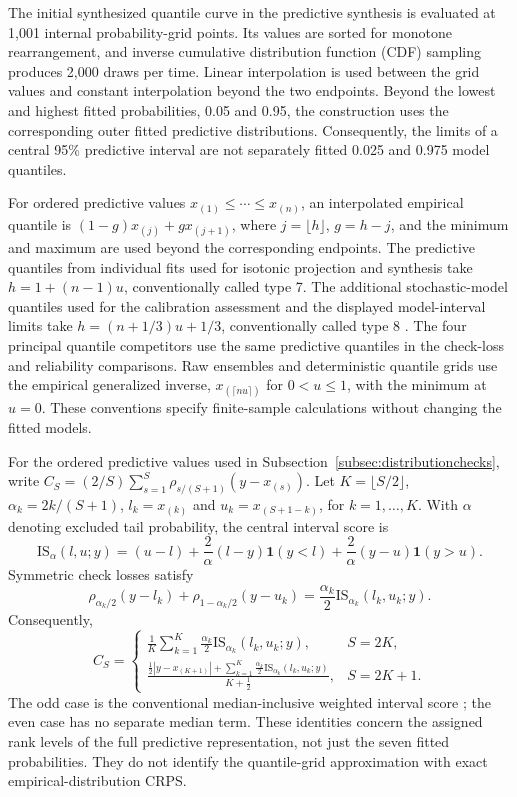 The initial synthesized quantile curve in the predictive synthesis is evaluated at 1,001 internal probability-grid points. Its values are sorted for monotone rearrangement, and inverse cumulative distribution function (CDF) sampling produces 2,000 draws per time. Linear interpolation is used between the grid values and constant interpolation beyond the two endpoints. Beyond the lowest and highest fitted probabilities, 0.05 and 0.95, the construction uses the corresponding outer fitted predictive distributions. Consequently, the limits of a central 95\% predictive interval are not separately fitted 0.025 and 0.975 model quantiles.

For ordered predictive values \(x_{(1)}\leq\cdots\leq x_{(n)}\), an interpolated empirical quantile is \((1-g)x_{(j)}+g x_{(j+1)}\), where \(j=\lfloor h\rfloor\), \(g=h-j\), and the minimum and maximum are used beyond the corresponding endpoints. The predictive quantiles from individual fits used for isotonic projection and synthesis take \(h=1+(n-1)u\), conventionally called type 7. The additional stochastic-model quantiles used for the calibration assessment and the displayed model-interval limits take \(h=(n+1/3)u+1/3\), conventionally called type 8 \citep{hyndman1996sample}. The four principal quantile competitors use the same predictive quantiles in the check-loss and reliability comparisons. Raw ensembles and deterministic quantile grids use the empirical generalized inverse, \(x_{(\lceil nu\rceil)}\) for \(0<u\leq1\), with the minimum at \(u=0\). These conventions specify finite-sample calculations without changing the fitted models.

For the ordered predictive values used in Subsection~\ref{subsec:distributionchecks}, write \(C_S=(2/S)\sum_{s=1}^S\rho_{s/(S+1)}(y-x_{(s)})\). Let \(K=\lfloor S/2\rfloor\), \(\alpha_k=2k/(S+1)\), \(l_k=x_{(k)}\) and \(u_k=x_{(S+1-k)}\), for \(k=1,\ldots,K\). With \(\alpha\) denoting excluded tail probability, the central interval score is
\[
\mathrm{IS}_{\alpha}(l,u;y)=(u-l)+\frac2\alpha(l-y)\mathbf1(y<l)
+\frac2\alpha(y-u)\mathbf1(y>u).
\]
Symmetric check losses satisfy
\[
\rho_{\alpha_k/2}(y-l_k)+\rho_{1-\alpha_k/2}(y-u_k)
=\frac{\alpha_k}{2}\mathrm{IS}_{\alpha_k}(l_k,u_k;y).
\]
Consequently,
\[
C_S=\begin{cases}
\displaystyle\frac1K\sum_{k=1}^K\frac{\alpha_k}{2}\mathrm{IS}_{\alpha_k}(l_k,u_k;y),&S=2K,\\[6pt]
\displaystyle\frac{\tfrac12|y-x_{(K+1)}|+\sum_{k=1}^K\tfrac{\alpha_k}{2}\mathrm{IS}_{\alpha_k}(l_k,u_k;y)}{K+\tfrac12},&S=2K+1.
\end{cases}
\]
The odd case is the conventional median-inclusive weighted interval score \citep{bracher2021evaluating}; the even case has no separate median term. These identities concern the assigned rank levels of the full predictive representation, not just the seven fitted probabilities. They do not identify the quantile-grid approximation with exact empirical-distribution CRPS.

